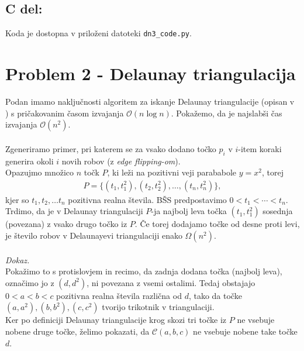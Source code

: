 \documentclass[a4paper,11pt]{article}
\begin{document}

\subsection*{C del:}
Koda je dostopna v priloženi datoteki \texttt{dn3\_code.py}.



\section*{Problem 2 - Delaunay triangulacija}
Podan imamo naključnosti algoritem za iskanje Delaunay triangulacije (opisan v \cite{delaunay}) s pričakovanim časom izvajanja $\mathcal{O}(n \log n)$. Pokažemo, da je najslabši čas izvajanja $\mathcal{O}(n^2)$.
\\
\\
Zgeneriramo primer, pri katerem se za vsako dodano točko $p_i$ v $i$-item koraki generira okoli $i$ novih robov (z \textit{edge flipping-om}).
\\
Opazujmo množico $n$ točk $P$, ki leži na pozitivni veji parababole $y = x^2$, torej
\begin{align*}
    P = \{ (t_1, t_1^2), (t_2, t_2^2), \ldots , (t_n, t_n^2)\},
\end{align*}
kjer so $t_1, t_2, \ldots t_n$ pozitivna realna števila. BŠS predpostavimo $0 < t_1 < \cdots < t_n$.
\\
Trdimo, da je v Delaunay triangulaciji $P$-ja najbolj leva točka $(t_1, t_1^2)$ sosednja (povezana) z vsako drugo točko iz $P$. 
Če torej dodajamo točke od desne proti levi, je število robov v Delaunayevi triangulaciji enako $\Omega(n^2)$.
\\
\\
\textit{Dokaz.} \\
Pokažimo to s protislovjem in recimo, da zadnja dodana točka (najbolj leva), označimo jo z $(d, d^2)$, ni povezana z vsemi ostalimi. 
Tedaj obstajajo $0 < a < b < c$ pozitivna realna števila različna od $d$, tako da točke $(a, a^2), (b, b^2), (c, c^2)$ tvorijo trikotnik v triangulaciji.
\\
Ker po definiciji Delaunay triangulacije krog skozi tri točke iz $P$ ne vsebuje nobene druge točke,
želimo pokazati, da $\mathcal{C}(a, b, c)$ ne vsebuje nobene take točke $d$.
\\
\end{document}
